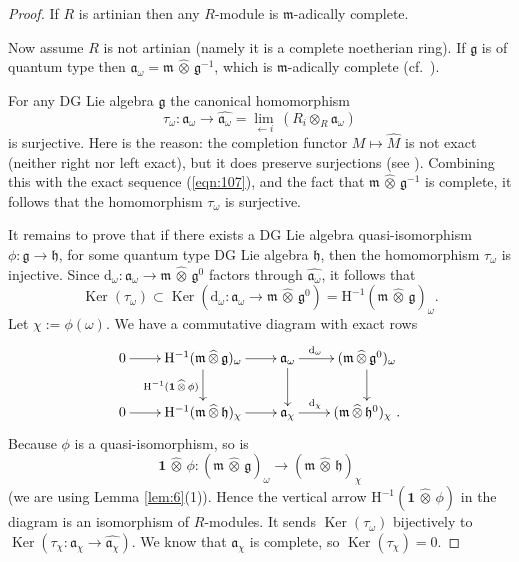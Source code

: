 \documentclass[a4paper,10pt]{amsart}
\theoremstyle{definition}
\numberwithin{equation}{section}
\newcommand{\opn}{\operatorname}
\newcommand{\mfrak}[1]{\mathfrak{#1}}
\newcommand{\mrm}[1]{\mathrm{#1}}
\newcommand{\bsym}[1]{\boldsymbol{#1}}
\newcommand{\ot}{\otimes}
\newcommand{\what}[1]{\widehat{#1}}
\newcommand{\hatotimes}{\, \what{\otimes} \,}
\newcommand{\hot}{\hatotimes}
\newcommand{\g}{\mfrak{g}}
\newcommand{\m}{\mfrak{m}}
\newcommand{\h}{\mfrak{h}}
\renewcommand{\a}{\mfrak{a}}
\renewcommand{\d}{\mrm{d}}
\newcommand{\om}{\omega}
\begin{document}
\begin{proof}
If $R$ is artinian then any $R$-module is $\m$-adically complete.

Now assume $R$ is not artinian (namely it is a complete noetherian ring). 
If $\g$ is of quantum type then 
$\a_{\om} = \m \hot \g^{-1}$, which is $\m$-adically complete (cf.\ 
\cite[Corollary 3.5]{Ye5}). 

For any DG Lie algebra $\g$ the canonical homomorphism 
\begin{equation} \label{eqn:108}
\tau_{\om} : \a_{\om} \to \what{\a_{\om}} = 
\lim_{\leftarrow i}\, (R_i \ot_R \a_{\om})
\end{equation}
is surjective. Here is the reason: the completion functor $M \mapsto \what{M}$
is not exact (neither right nor left exact), but it does preserve surjections
(see \cite[Proposition 1.2]{Ye5}). Combining this with the
exact sequence (\ref{eqn:107}), and the fact that $\m \hot \g^{-1}$ is
complete, it follows that the homomorphism $\tau_{\om}$ is surjective.

It remains to prove that if there exists a DG Lie algebra quasi-isomorphism
$\phi : \g \to \h$, for some quantum type DG Lie algebra $\h$, then the
homomorphism $\tau_{\om}$ is injective. Since 
$\d_{\om} : \a_{\om} \to \m \hot \g^{0}$ factors through 
$\what{\a_{\om}}$, it follows that 
\[ \opn{Ker}(\tau_{\om}) \subset 
\opn{Ker}(\d_{\om} : \a_{\om} \to \m \hot \g^{0}) = 
\mrm{H}^{-1}(\m \hot \g)_{\om} . \]
Let $\chi := \phi(\om)$. We have a commutative diagram with exact rows 
\[ \UseTips \xymatrix @C=5ex @R=5ex {
0
\ar[r]
&
\mrm{H}^{-1}(\m \hot \g)_{\om}
\ar[r]
\ar[d]_{\mrm{H}^{-1}(\bsym{1} \hot \phi)}
&
\a_{\om}
\ar[r]^(0.35){\d_{\om}}
\ar[d]
&
(\m \hot \g^0)_{\om}
\ar[d]
\\
0
\ar[r]
&
\mrm{H}^{-1}(\m \hot \h)_{\chi}
\ar[r]
&
\a_{\chi}
\ar[r]^(0.35){\d_{\chi}}
&
(\m \hot \h^0)_{\chi} \ .
} \]
Because $\phi$ is a quasi-isomorphism, so is 
\[ \bsym{1} \hot \phi : (\m \hot \g)_{\om} \to 
(\m \hot \h)_{\chi} \]
(we are using Lemma \ref{lem:6}(1)).
Hence the vertical arrow $\mrm{H}^{-1}(\bsym{1} \hot \phi)$ in the diagram is an
isomorphism of $R$-modules. It sends $\opn{Ker}(\tau_{\om})$ bijectively to 
$\opn{Ker}(\tau_{\chi} : \a_{\chi} \to \what{\a_{\chi}})$.
We know that $\a_{\chi}$ is complete, so  $\opn{Ker}(\tau_{\chi}) = 0$.
\end{proof}
\end{document}
